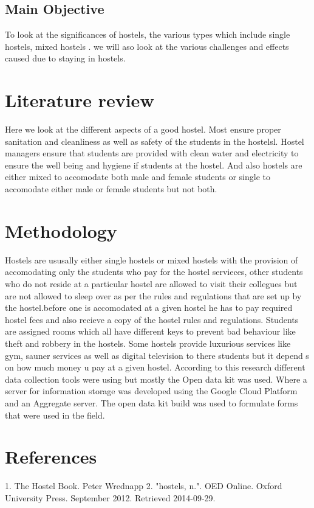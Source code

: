 \documentclass[12pt]{article}
\begin{document}
\subsection{Main Objective}
To look at the significances of hostels, the various types which include single hostels, mixed hostels . we will aso look at the various  challenges and effects caused due to staying in hostels.

\section{Literature review}
Here we look at  the different aspects of a good hostel. Most  ensure proper sanitation and cleanliness as well as safety of the students in the hostelsl. Hostel managers ensure that students are provided with clean water and electricity to ensure the well being and hygiene if students at the hostel. And also hostels are either mixed to accomodate both male and female students or single to accomodate either male or female students but not both.
	

\section{Methodology}
 Hostels are ususally either single hostels or mixed hostels  with the provision of accomodating only the students who pay for the hostel servieces, other students who do not reside at a particular hostel are allowed to visit their collegues  but are not allowed to sleep over as per the rules and regulations that are set up by the hostel.before one is accomodated at a given hostel he has to pay required hostel fees and also recieve a copy of the hostel rules  and regulations. 
 Students are assigned rooms which all have different keys to prevent bad behaviour like theft and robbery in the hostels.
Some hostels provide luxurious services like gym, sauner services as well as digital television to there students but it depend s on how much money u pay at a given hostel.
According to this research different data collection tools were using but mostly the Open data kit was used. Where a server for information storage was developed using the Google Cloud Platform and an Aggregate server. The open data kit build was used to formulate forms that were used in the field.

\section{References}
1. The Hostel Book. Peter Wrednapp
2. "hostels, n.". OED Online. Oxford University Press. September 2012. Retrieved 2014-09-29.
\end{document}
